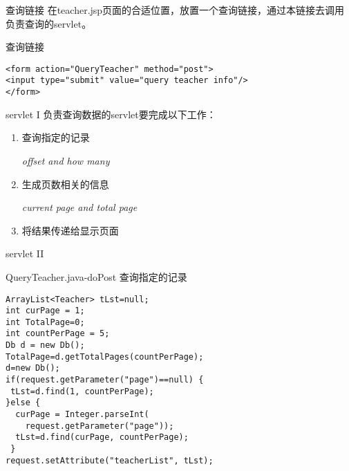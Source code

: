 \documentclass{beamer}
\begin{document}
\begin{frame}[fragile]{查询链接}
在teacher.jsp页面的合适位置，放置一个查询链接，通过本链接去调用负责查询的servlet。
\begin{block}{查询链接}
\begin{verbatim}
<form action="QueryTeacher" method="post">
<input type="submit" value="query teacher info"/>
</form>
\end{verbatim}
\end{block}
\end{frame}

\begin{frame}{servlet I}
负责查询数据的servlet要完成以下工作：
\begin{enumerate}
\item
查询指定的记录

\emph{offset and how many}
\item
生成页数相关的信息

\emph{current page and total page}
\item
将结果传递给显示页面

\end{enumerate}
\end{frame}
\begin{frame}[fragile]{servlet II}
\begin{block}{QueryTeacher.java-doPost 查询指定的记录}
\begin{verbatim}
ArrayList<Teacher> tLst=null;
int curPage = 1;
int TotalPage=0;
int countPerPage = 5;
Db d = new Db();
TotalPage=d.getTotalPages(countPerPage);
d=new Db();
if(request.getParameter("page")==null) {
 tLst=d.find(1, countPerPage);
}else {
  curPage = Integer.parseInt(
    request.getParameter("page"));
  tLst=d.find(curPage, countPerPage);
 }		
request.setAttribute("teacherList", tLst);
\end{verbatim}
\end{block}
\end{frame}
\end{document}

